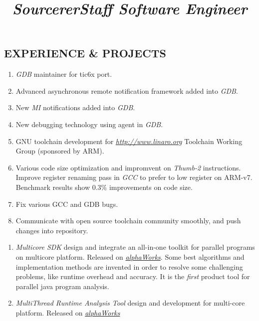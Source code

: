 \begin{resume}
\section{\textsc{EXPERIENCE \& PROJECTS}}
\title{\emph{Sourcerer}}
\begin{position}
\begin{enumerate}
\item[] \emph{GDB} maintainer for tic6x port.
\item[] Advanced asynchronous remote notification framework added into \emph{GDB}.
\item[] New \emph{MI} notifications added into \emph{GDB}.
\item[] New debugging technology using agent in \emph{GDB}.
\item[] GNU toolchain development for \href{http://www.linaro.org}{\emph{http://www.linaro.org}} Toolchain Working Group (sponsored by ARM).
\item[] Various code size optimization and impromvent on \emph{Thumb-2} instructions.  Improve register renaming pass in \emph{GCC} to prefer to low register on ARM-v7.  Benchmark results show 0.3\% improvements on code size.
\item[] Fix various GCC and GDB bugs.
\item[] Communicate with open source toolchain community smoothly, and push changes into repository.
\end{enumerate}
\end{position}

\title{\emph{Staff Software Engineer}}
\begin{position}
\begin{enumerate}
\item[] \emph{Multicore SDK} design and integrate an all-in-one toolkit for parallel programs on multicore platform.  Released on \href{http://www.alphaworks.ibm.com/tech/msdk}{\emph{alphaWorks}}.  Some best algorithms and implementation methods are invented in order to resolve some challenging problems, like runtime overhead and accuracy.  It is the \emph{first} product tool for parallel java program analysis.
\item[] \emph{MultiThread Runtime Analysis Tool} design and development for multi-core platform.  Released on \href{http://www.alphaworks.ibm.com/tech/mtrat}{\emph{alphaWorks}}


\end{enumerate}
\end{position}
\end{resume}
